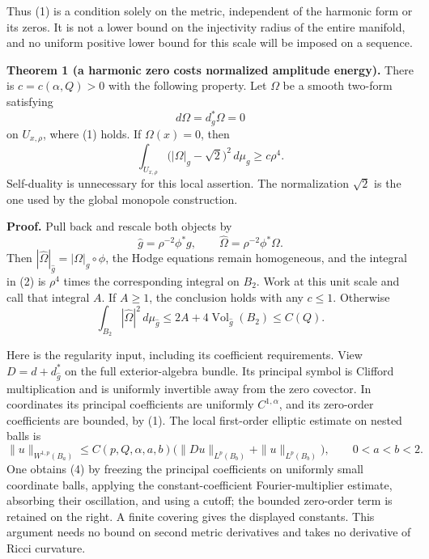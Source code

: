 \documentclass[
  11pt,
]{article}
\begin{document}
Thus (1) is a condition solely on the metric, independent of the
harmonic form or its zeros. It is not a lower bound on the injectivity
radius of the entire manifold, and no uniform positive lower bound for
this scale will be imposed on a sequence.

\textbf{Theorem 1 (a harmonic zero costs normalized amplitude energy).}
There is \(c=c(\alpha,Q)>0\) with the following property. Let \(\Omega\)
be a smooth two-form satisfying \[
                         d\Omega=d_g^*\Omega=0
\] on \(U_{x,\rho}\), where (1) holds. If \(\Omega(x)=0\), then \[
 \boxed{\displaystyle
  \int_{U_{x,\rho}}\bigl(|\Omega|_g-\sqrt2\bigr)^2\,d\mu_g
       \ge c\rho^4.}                                      \tag{2}
\] Self-duality is unnecessary for this local assertion. The
normalization \(\sqrt2\) is the one used by the global monopole
construction.

\textbf{Proof.} Pull back and rescale both objects by \[
          \widehat g=\rho^{-2}\phi^*g,\qquad
          \widehat\Omega=\rho^{-2}\phi^*\Omega.
\] Then \(|\widehat\Omega|_{\widehat g}=|\Omega|_g\circ\phi\), the Hodge
equations remain homogeneous, and the integral in (2) is \(\rho^4\)
times the corresponding integral on \(B_2\). Work at this unit scale and
call that integral \(A\). If \(A\ge1\), the conclusion holds with any
\(c\le1\). Otherwise \[
 \int_{B_2}|\widehat\Omega|^2\,d\mu_{\widehat g}
 \le 2A+4\operatorname{Vol}_{\widehat g}(B_2)\le C(Q).       \tag{3}
\]

Here is the regularity input, including its coefficient requirements.
View \(D=d+d_{\widehat g}^*\) on the full exterior-algebra bundle. Its
principal symbol is Clifford multiplication and is uniformly invertible
away from the zero covector. In coordinates its principal coefficients
are uniformly \(C^{1,\alpha}\), and its zero-order coefficients are
bounded, by (1). The local first-order elliptic estimate on nested balls
is \[
 \|u\|_{W^{1,p}(B_a)}
 \le C(p,Q,\alpha,a,b)
       \bigl(\|Du\|_{L^p(B_b)}+\|u\|_{L^p(B_b)}\bigr),
 \qquad 0<a<b<2.                                         \tag{4}
\] One obtains (4) by freezing the principal coefficients on uniformly
small coordinate balls, applying the constant-coefficient
Fourier-multiplier estimate, absorbing their oscillation, and using a
cutoff; the bounded zero-order term is retained on the right. A finite
covering gives the displayed constants. This argument needs no bound on
second metric derivatives and takes no derivative of Ricci curvature.
\end{document}
